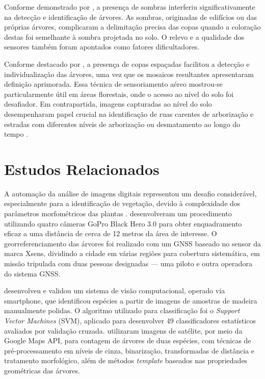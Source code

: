 \documentclass[
    12pt,
    openright,
    oneside,
    a4paper,
    sumario=tradicional,
    english,
    brazil,
    ]{abntex2}
\begin{document}
Conforme demonstrado por \textcite{neto2012detecccao}, a presença de sombras interferiu significativamente na detecção e identificação de árvores. As sombras, originadas de edifícios ou das próprias árvores, complicaram a delimitação precisa das copas quando a coloração destas foi semelhante à sombra projetada no solo. O relevo e a qualidade dos sensores também foram apontados como fatores dificultadores.

Conforme destacado por \textcite{Arantes_Arantes_Santos_Ventura_Gomes_2020}, a presença de copas espaçadas facilitou a detecção e individualização das árvores, uma vez que os mosaicos resultantes apresentaram definição aprimorada. Essa técnica de sensoriamento aéreo mostrou-se particularmente útil em áreas florestais, onde o acesso ao nível do solo foi desafiador. Em contrapartida, imagens capturadas ao nível do solo desempenharam papel crucial na identificação de ruas carentes de arborização e estradas com diferentes níveis de arborização ou desmatamento ao longo do tempo \cite{DBLP:journals/corr/abs-2201-06569}.

\section{Estudos Relacionados}

A automação da análise de imagens digitais representou um desafio considerável, especialmente para a identificação de vegetação, devido à complexidade dos parâmetros morfométricos das plantas \cite{sa2021detecccao}. \textcite{barbosa2018quantificaccao} desenvolveram um procedimento utilizando quatro câmeras GoPro Black Hero 3.0 para obter enquadramento eficaz a uma distância de cerca de 12 metros da área de interesse. O georreferenciamento das árvores foi realizado com um GNSS baseado no sensor da marca Xsens, dividindo a cidade em várias regiões para cobertura sistemática, em missão tripulada com duas pessoas designadas --- uma piloto e outra operadora do sistema GNSS.

\textcite{andrade2020visao} desenvolveu e validou um sistema de visão computacional, operado via smartphone, que identificou espécies a partir de imagens de amostras de madeira manualmente polidas. O algoritmo utilizado para classificação foi o \textit{Support Vector Machines} (SVM), aplicado para desenvolver 49 classificadores estatísticos avaliados por validação cruzada. \textcite{da2019metodologias} utilizaram imagens de satélite, por meio da Google Maps API, para contagem de árvores de duas espécies, com técnicas de pré-processamento em níveis de cinza, binarização, transformadas de distância e tratamento morfológico, além de métodos \textit{template} baseados nas propriedades geométricas das árvores.
\end{document}
